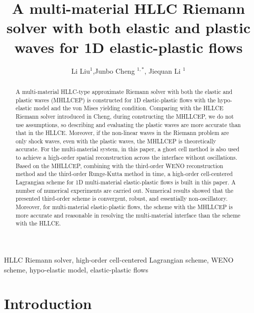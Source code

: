 \documentclass{article}
\numberwithin{equation}{section}
\numberwithin{table}{section}
\begin{document}
\title{A multi-material HLLC Riemann solver with both elastic and plastic waves for 1D  elastic-plastic flows}
\author{Li Liu$^1$,Junbo Cheng $^{1,*}$, Jiequan Li $^{1}$}

\maketitle


\begin{abstract}
  A multi-material HLLC-type  approximate Riemann solver with both the elastic and plastic waves (MHLLCEP) is constructed for 1D elastic-plastic flows with the  hypo-elastic model and the von Mises yielding condition. Comparing with the HLLCE Riemann solver introduced in Cheng, during constructing  the MHLLCEP, we do not use assumptions, so describing and evaluating the plastic waves are more accurate than that in the  HLLCE. Moreover, if the non-linear waves in the Riemann problem are only shock waves, even with the plastic waves, the MHLLCEP is theoretically accurate. For  the multi-material system, in this paper,  a ghost cell method is also used to achieve a high-order spatial reconstruction across the interface without oscillations. Based on  the MHLLCEP, combining with the third-order WENO reconstruction method and the third-order Runge-Kutta method in time, a high-order cell-centered Lagrangian scheme for 1D multi-material  elastic-plastic flows is built in this paper. A number of numerical experiments are carried out. Numerical results showed  that the presented third-order scheme is convergent, robust, and essentially non-oscillatory. Moreover, for multi-material elastic-plastic flows, the scheme with  the MHLLCEP is more accurate and reasonable in resolving the multi-material interface than the scheme with the  HLLCE.
\end{abstract}

\begin{keyword}
  HLLC Riemann solver, high-order cell-centered Lagrangian scheme,  WENO scheme,  hypo-elastic model, elastic-plastic flows
\end{keyword}

\section{Introduction}
\end{document}
